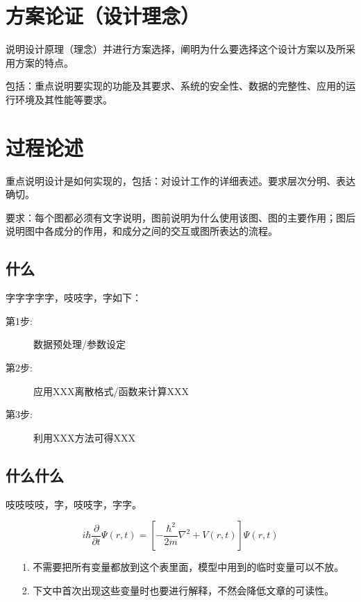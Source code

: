 \documentclass{ctexart}
\begin{document}
\section{方案论证（设计理念）}

说明设计原理（理念）并进行方案选择，阐明为什么要选择这个设计方案以及所采用方案的特点。

包括：重点说明要实现的功能及其要求、系统的安全性、数据的完整性、应用的运行环境及其性能等要求。

\section{过程论述}

重点说明设计是如何实现的，包括：对设计工作的详细表述。要求层次分明、表达确切。

要求：每个图都必须有文字说明，图前说明为什么使用该图、图的主要作用；图后说明图中各成分的作用，和成分之间的交互或图所表达的流程。

\subsection{什么}

字字字字字，吱吱字，字如下：
\begin{description}
	\item[第1步:] 数据预处理/参数设定
	\item[第2步:] 应用XXX离散格式/函数来计算XXX
	\item[第3步:] 利用XXX方法可得XXX
\end{description}

\subsection{什么什么}

吱吱吱吱，字，吱吱字，字字。

\begin{equation}\label{eq1}
	i\hbar\frac{\partial}{\partial t} \Psi(r,t)  = \left[
	-\frac{\hbar^2}{2m}\nabla^2+V(r,t) \right]\Psi(r,t) 
\end{equation}

\begin{itemize}
	\item[1.]不需要把所有变量都放到这个表里面，模型中用到的临时变量可以不放。
	\item[2.]下文中首次出现这些变量时也要进行解释，不然会降低文章的可读性。
\end{itemize}
\end{document}
